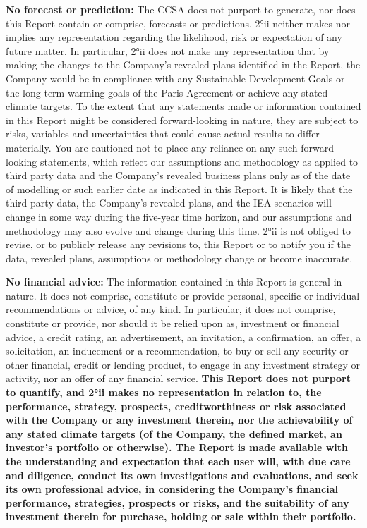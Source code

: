 \documentclass[10pt,table,a4]{article}\usepackage[]{graphicx}\usepackage[]{color}
\begin{document}
{	\textbf{No forecast or prediction:}
	The CCSA does not purport to generate, nor does this Report contain or comprise, forecasts or predictions. 2°ii neither makes nor implies any representation regarding the likelihood, risk or expectation of any future matter. In particular, 2°ii does not make any representation that by making the changes to the Company's revealed plans identified in the Report, the Company would be in compliance with any Sustainable Development Goals or the long-term warming goals of the Paris Agreement or achieve any stated climate targets. To the extent that any statements made or information contained in this Report might be considered forward-looking in nature, they are subject to risks, variables and uncertainties that could cause actual results to differ materially. You are cautioned not to place any reliance on any such forward-looking statements, which reflect our assumptions and methodology as applied to third party data and the Company's revealed business plans only as of the date of modelling or such earlier date as indicated in this Report. It is likely that the third party data, the Company's revealed plans, and the IEA scenarios will change in some way during the five-year time horizon, and our assumptions and methodology may also evolve and change during this time. 2°ii is not obliged to revise, or to publicly release any revisions to, this Report or to notify you if the data, revealed plans, assumptions or methodology change or become inaccurate.  
	
	\textbf{No financial advice:}
	The information contained in this Report is general in nature. It does not comprise, constitute or provide personal, specific or individual recommendations or advice, of any kind. In particular, it does not comprise, constitute or provide, nor should it be relied upon as, investment or financial advice, a credit rating, an advertisement, an invitation, a confirmation, an offer, a solicitation, an inducement or a recommendation, to buy or sell any security or other financial, credit or lending product, to engage in any investment strategy or activity, nor an offer of any financial service. \textbf{This Report does not purport to quantify, and 2°ii makes no representation in relation to, the performance, strategy, prospects, creditworthiness or risk associated with the Company or any investment therein, nor the achievability of any stated climate targets (of the Company, the defined market, an investor's portfolio or otherwise). The Report is made available with the understanding and expectation that each user will, with due care and diligence, conduct its own investigations and evaluations, and seek its own professional advice, in considering the Company's financial performance, strategies, prospects or risks, and the suitability of any investment therein for purchase, holding or sale within their portfolio.}
	
}
\end{document}
